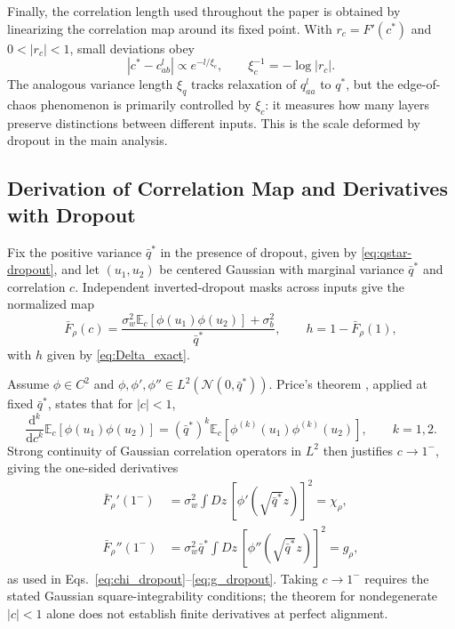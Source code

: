 Finally, the correlation length used throughout the paper is obtained by linearizing the correlation map around its fixed point. With $r_c=F'(c^*)$ and $0<|r_c|<1$, small deviations obey
\begin{equation}
|c^*-c^l_{ab}|\propto e^{-l/\xi_c},\qquad \xi_c^{-1}=-\log|r_c|.
\end{equation}
The analogous variance length $\xi_q$ tracks relaxation of $q^l_{aa}$ to $q^*$, but the edge-of-chaos phenomenon is primarily controlled by $\xi_c$: it measures how many layers preserve distinctions between different inputs. This is the scale deformed by dropout in the main analysis.
\FloatBarrier

\subsection{Derivation of Correlation Map and Derivatives with Dropout}\label{app:price_dropout}

Fix the positive variance \(\bar q^*\) in the presence of dropout, given by \eqref{eq:qstar-dropout}, and let \((u_1,u_2)\) be centered Gaussian with marginal variance \(\bar q^*\) and correlation \(c\). Independent inverted-dropout masks across inputs give the normalized map
\begin{equation}
\bar F_\rho(c)=\frac{\sigma_w^2\mathbb E_c[\phi(u_1)\phi(u_2)]+\sigma_b^2}{\bar q^*},
\qquad h=1-\bar F_\rho(1),
\label{eq:Frho_def_app}
\end{equation}
with \(h\) given by \eqref{eq:Delta_exact}.

Assume \(\phi\in C^2\) and \(\phi,\phi',\phi''\in L^2(\mathcal N(0,\bar q^*))\). Price's theorem \cite{Price1958GaussianInputs,Voigtlaender2021Price}, applied at fixed \(\bar q^*\), states that for \(|c|<1\),
\begin{equation}
\frac{\mathrm d^k}{\mathrm dc^k}\mathbb E_c[\phi(u_1)\phi(u_2)]
=(\bar q^*)^k\mathbb E_c[\phi^{(k)}(u_1)\phi^{(k)}(u_2)],
\qquad k=1,2.
\end{equation}
Strong continuity of Gaussian correlation operators in \(L^2\) then justifies \(c\to1^-\), giving the one-sided derivatives
\begin{align}
\bar F_\rho'(1^-)&=\sigma_w^2\int Dz\,[\phi'(\sqrt{\bar q^*}z)]^2=\chi_\rho,\\
\bar F_\rho''(1^-)&=\sigma_w^2\bar q^*\int Dz\,[\phi''(\sqrt{\bar q^*}z)]^2=g_\rho,
\end{align}
as used in Eqs.~\eqref{eq:chi_dropout}--\eqref{eq:g_dropout}. Taking \(c\to1^-\) requires the stated Gaussian square-integrability conditions; the theorem for nondegenerate \(|c|<1\) alone does not establish finite derivatives at perfect alignment.

